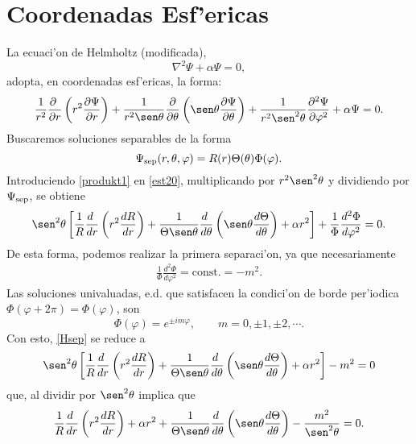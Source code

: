 \section{Coordenadas Esf'ericas}
La ecuaci'on de Helmholtz (modificada),
\begin{equation}
\nabla^2\Psi+\alpha\Psi=0,
\end{equation}
adopta, en coordenadas esf'ericas, la forma:
\begin{equation}
\frac{1}{r^2}\frac{\partial\ }{\partial r}\left(r^2\frac{\partial\Psi}{\partial r}\right)   
+\frac{1}{r^2\sen\theta}\frac{\partial}{\partial\theta}\left(\sen\theta\frac{
\partial\Psi}{\partial\theta}\right) + \frac{1}{r^2\sen^2  \theta}
\frac{\partial^2\Psi}{\partial \varphi^2}  +\alpha\Psi= 0.\label{est20}
 \end{equation}
Buscaremos soluciones separables de la forma 
 \begin{equation}\label{produkt1}
  \Psi_{\rm sep}(r,\theta,\varphi) = R(r)\Theta(\theta)\Phi(\varphi).
 \end{equation}
 Introduciendo \eqref{produkt1} en \eqref{est20}, multiplicando por $r^2\sen^2\theta$ y dividiendo por $\Psi_{\rm sep}$, se obtiene
\begin{equation}\label{Hsep}
\sen^2\theta\left[\frac{1}{R}\frac{d\ }{dr}\left(r^2\frac{dR}{dr}\right) +
\frac{1}{\Theta\sen\theta}\frac{d\ }{d\theta}\left(\sen\theta\frac{
d\Theta}{d\theta}\right) +\alpha r^2\right]+ \frac{1}{\Phi}\frac{d^2 \Phi}{d\varphi^2} = 0.
 \end{equation}
De esta forma, podemos realizar la primera separaci'on, ya que necesariamente
\begin{eqnarray}
\frac{1}{\Phi} \frac{d^2\Phi}{d\varphi^2} = \text{const.} = -m^2. \end{eqnarray}\label{loes1}
Las soluciones univaluadas, e.d. que satisfacen la condici'on de borde per'iodica $\Phi(\varphi+2\pi)=\Phi(\varphi)$, son
\begin{equation}\label{Phim}
\Phi (\varphi) = e^{\pm im\varphi}, \qquad m=0,\pm 1,\pm 2, \cdots .
\end{equation}
Con esto, \eqref{Hsep} se reduce a
\begin{equation}
\sen^2\theta\left[\frac{1}{R}\frac{d\ }{dr}\left(r^2\frac{dR}{dr}\right) +
\frac{1}{\Theta\sen\theta}\frac{d\ }{d\theta}\left(\sen\theta\frac{
d\Theta}{d\theta}\right) +\alpha r^2\right]-m^2 = 0
 \end{equation}
que, al dividir por $\sen^2\theta$ implica que
\begin{equation}
\frac{1}{R}\frac{d\ }{dr}\left(r^2\frac{dR}{dr}\right)+\alpha r^2
+\frac{1}{\Theta\sen\theta}\frac{d\ }{d\theta}\left(\sen\theta\frac{
d\Theta}{d\theta}\right) -\frac{m^2}{\sen^2\theta} = 0.
 \end{equation}
